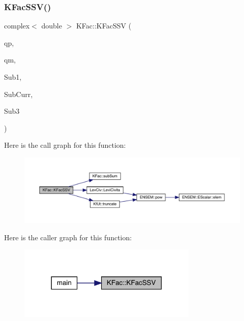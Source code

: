 \subsubsection{\texorpdfstring{KFacSSV()}{KFacSSV()}}
{\footnotesize\ttfamily complex$<$ double $>$ K\+Fac\+::\+K\+Fac\+S\+SV (\begin{DoxyParamCaption}\item[{Eigen\+::\+Vector\+Xd \&}]{qp,  }\item[{Eigen\+::\+Vector\+Xd \&}]{qm,  }\item[{map$<$ int, Eigen\+::\+Matrix\+Xcd $>$ \&}]{Sub1,  }\item[{map$<$ int, Eigen\+::\+Matrix\+Xcd $>$ \&}]{Sub\+Curr,  }\item[{map$<$ int, Eigen\+::\+Matrix\+Xcd $>$ \&}]{Sub3 }\end{DoxyParamCaption})}

Here is the call graph for this function\+:
\nopagebreak
\begin{figure}[H]
\begin{center}
\leavevmode
\includegraphics[width=350pt]{d2/d89/namespaceKFac_a4cb65a4089c62e25d5511e2711fed59d_cgraph}
\end{center}
\end{figure}
Here is the caller graph for this function\+:
\nopagebreak
\begin{figure}[H]
\begin{center}
\leavevmode
\includegraphics[width=242pt]{d2/d89/namespaceKFac_a4cb65a4089c62e25d5511e2711fed59d_icgraph}
\end{center}
\end{figure}
\mbox{\label{namespaceKFac_a02b5c2876eea15ce628ac7cc58a4b746}} 
